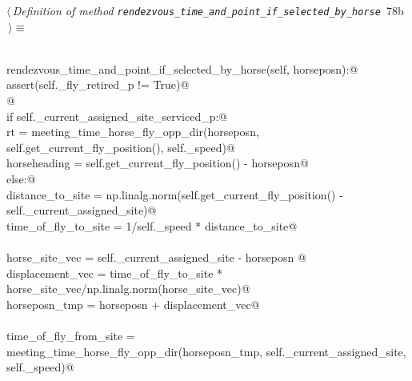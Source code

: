 \documentclass[11.5pt]{report}
\begin{document}
\vspace{-0.8cm} \newchunk  
{}
\begin{flushleft} \small\label{scrap118}\raggedright\small
{} $\langle\,${\itshape Definition of method \verb|rendezvous_time_and_point_if_selected_by_horse|}\nobreak\ {\footnotesize {78b}}$\,\rangle\equiv$
\vspace{-1ex}
\begin{list}{}{} \item
\mbox{}\verb@@\\
\mbox{}\verb@def rendezvous_time_and_point_if_selected_by_horse(self, horseposn):@\\
\mbox{}\verb@   assert(self._fly_retired_p != True)@\\
\mbox{}\verb@  @\\
\mbox{}\verb@   if self._current_assigned_site_serviced_p:@\\
\mbox{}\verb@       rt = meeting_time_horse_fly_opp_dir(horseposn, self.get_current_fly_position(), self._speed)@\\
\mbox{}\verb@       horseheading = self.get_current_fly_position() - horseposn@\\
\mbox{}\verb@   else:@\\
\mbox{}\verb@      distance_to_site    = np.linalg.norm(self.get_current_fly_position() -\@\\
\mbox{}\verb@                                           self._current_assigned_site)@\\
\mbox{}\verb@      time_of_fly_to_site = 1/self._speed * distance_to_site@\\
\mbox{}\verb@@\\
\mbox{}\verb@      horse_site_vec   = self._current_assigned_site - horseposn @\\
\mbox{}\verb@      displacement_vec = time_of_fly_to_site * horse_site_vec/np.linalg.norm(horse_site_vec)@\\
\mbox{}\verb@      horseposn_tmp   = horseposn + displacement_vec@\\
\mbox{}\verb@@\\
\mbox{}\verb@      time_of_fly_from_site = \@\\
\mbox{}\verb@               meeting_time_horse_fly_opp_dir(horseposn_tmp, self._current_assigned_site, self._speed)@\\

\end{list}
\end{flushleft}
\end{document}
